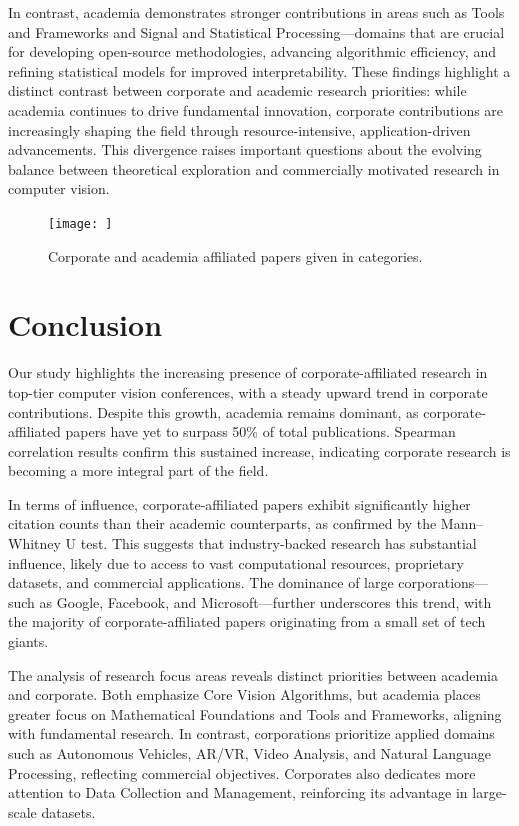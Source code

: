 \documentclass{article}
\begin{document}
In contrast, academia demonstrates stronger contributions in areas such as Tools and Frameworks and Signal and Statistical Processing—domains that are crucial for developing open-source methodologies, advancing algorithmic efficiency, and refining statistical models for improved interpretability. These findings highlight a distinct contrast between corporate and academic research priorities: while academia continues to drive fundamental innovation, corporate contributions are increasingly shaping the field through resource-intensive, application-driven advancements. This divergence raises important questions about the evolving balance between theoretical exploration and commercially motivated research in computer vision.



\begin{figure}[ht]
  \centering
  \texttt{[image: ]}  
  \caption{Corporate and academia affiliated papers given in categories.}
  \label{fig:research_focus_radar}
\end{figure}

\section{Conclusion}
Our study highlights the increasing presence of corporate-affiliated research in top-tier computer vision conferences, with a steady upward trend in corporate contributions. Despite this growth, academia remains dominant, as corporate-affiliated papers have yet to surpass 50\% of total publications. Spearman correlation results confirm this sustained increase, indicating corporate research is becoming a more integral part of the field.

In terms of influence, corporate-affiliated papers exhibit significantly higher citation counts than their academic counterparts, as confirmed by the Mann–Whitney U test. This suggests that industry-backed research has substantial influence, likely due to access to vast computational resources, proprietary datasets, and commercial applications. The dominance of large corporations—such as Google, Facebook, and Microsoft—further underscores this trend, with the majority of corporate-affiliated papers originating from a small set of tech giants. 

The analysis of research focus areas reveals distinct priorities between academia and corporate. Both emphasize Core Vision Algorithms, but academia places greater focus on Mathematical Foundations and Tools and Frameworks, aligning with fundamental research. In contrast, corporations prioritize applied domains such as Autonomous Vehicles, AR/VR, Video Analysis, and Natural Language Processing, reflecting commercial objectives. Corporates also dedicates more attention to Data Collection and Management, reinforcing its advantage in large-scale datasets.
\end{document}
